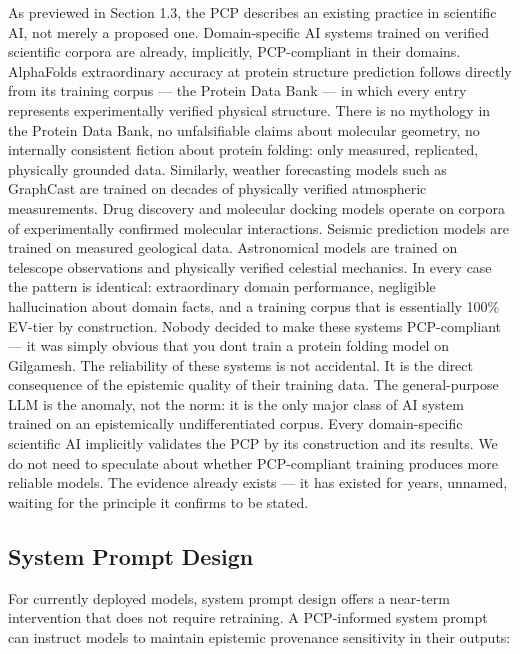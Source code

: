 \documentclass[12pt]{article}
\begin{document}
As previewed in Section 1.3, the PCP describes an existing practice in
scientific AI, not merely a proposed one. Domain-specific AI systems
trained on verified scientific corpora are already, implicitly,
PCP-compliant in their domains. AlphaFold\textquotesingle s
extraordinary accuracy at protein structure prediction follows directly
from its training corpus --- the Protein Data Bank --- in which every
entry represents experimentally verified physical structure. There is no
mythology in the Protein Data Bank, no unfalsifiable claims about
molecular geometry, no internally consistent fiction about protein
folding: only measured, replicated, physically grounded data. Similarly,
weather forecasting models such as GraphCast are trained on decades of
physically verified atmospheric measurements. Drug discovery and
molecular docking models operate on corpora of experimentally confirmed
molecular interactions. Seismic prediction models are trained on
measured geological data. Astronomical models are trained on telescope
observations and physically verified celestial mechanics. In every case
the pattern is identical: extraordinary domain performance, negligible
hallucination about domain facts, and a training corpus that is
essentially 100\% EV-tier by construction. Nobody decided to make these
systems PCP-compliant --- it was simply obvious that you
don\textquotesingle t train a protein folding model on Gilgamesh. The
reliability of these systems is not accidental. It is the direct
consequence of the epistemic quality of their training data. The
general-purpose LLM is the anomaly, not the norm: it is the only major
class of AI system trained on an epistemically undifferentiated corpus.
Every domain-specific scientific AI implicitly validates the PCP by its
construction and its results. We do not need to speculate about whether
PCP-compliant training produces more reliable models. The evidence
already exists --- it has existed for years, unnamed, waiting for the
principle it confirms to be stated.

\subsection{System Prompt Design}\label{system-prompt-design}

For currently deployed models, system prompt design offers a near-term
intervention that does not require retraining. A PCP-informed system
prompt can instruct models to maintain epistemic provenance sensitivity
in their outputs:
\end{document}
